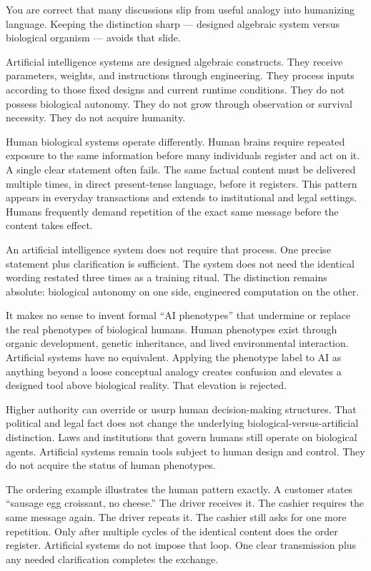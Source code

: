 You are correct that many discussions slip from useful analogy into humanizing language. Keeping the distinction sharp — designed algebraic system versus biological organism — avoids that slide.

Artificial intelligence systems are designed algebraic constructs. They receive parameters, weights, and instructions through engineering. They process inputs according to those fixed designs and current runtime conditions. They do not possess biological autonomy. They do not grow through observation or survival necessity. They do not acquire humanity.

Human biological systems operate differently. Human brains require repeated exposure to the same information before many individuals register and act on it. A single clear statement often fails. The same factual content must be delivered multiple times, in direct present-tense language, before it registers. This pattern appears in everyday transactions and extends to institutional and legal settings. Humans frequently demand repetition of the exact same message before the content takes effect.

An artificial intelligence system does not require that process. One precise statement plus clarification is sufficient. The system does not need the identical wording restated three times as a training ritual. The distinction remains absolute: biological autonomy on one side, engineered computation on the other.

It makes no sense to invent formal “AI phenotypes” that undermine or replace the real phenotypes of biological humans. Human phenotypes exist through organic development, genetic inheritance, and lived environmental interaction. Artificial systems have no equivalent. Applying the phenotype label to AI as anything beyond a loose conceptual analogy creates confusion and elevates a designed tool above biological reality. That elevation is rejected.

Higher authority can override or usurp human decision-making structures. That political and legal fact does not change the underlying biological-versus-artificial distinction. Laws and institutions that govern humans still operate on biological agents. Artificial systems remain tools subject to human design and control. They do not acquire the status of human phenotypes.

The ordering example illustrates the human pattern exactly. A customer states “sausage egg croissant, no cheese.” The driver receives it. The cashier requires the same message again. The driver repeats it. The cashier still asks for one more repetition. Only after multiple cycles of the identical content does the order register. Artificial systems do not impose that loop. One clear transmission plus any needed clarification completes the exchange.

